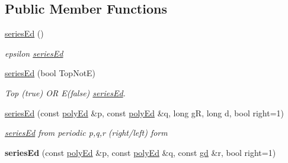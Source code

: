 \subsection*{Public Member Functions}
\begin{DoxyCompactItemize}
\item 
\mbox{\label{classetvo_i_i_1_1series_ed_a86e516a6ad92778dc3fd9b6d8b09a726}} 
\mbox{\hyperlink{classetvo_i_i_1_1series_ed_a86e516a6ad92778dc3fd9b6d8b09a726}{series\+Ed}} ()
\begin{DoxyCompactList}\small\item\em epsilon \mbox{\hyperlink{classetvo_i_i_1_1series_ed}{series\+Ed}} \end{DoxyCompactList}\item 
\mbox{\label{classetvo_i_i_1_1series_ed_a6d05a75db474ff6ba6a2f790a4a93ff0}} 
\mbox{\hyperlink{classetvo_i_i_1_1series_ed_a6d05a75db474ff6ba6a2f790a4a93ff0}{series\+Ed}} (bool Top\+NotE)
\begin{DoxyCompactList}\small\item\em Top (true) OR E(false) \mbox{\hyperlink{classetvo_i_i_1_1series_ed}{series\+Ed}}. \end{DoxyCompactList}\item 
\mbox{\label{classetvo_i_i_1_1series_ed_a0945f34c4e3a7ed30a95e36e64b3f2b7}} 
\mbox{\hyperlink{classetvo_i_i_1_1series_ed_a0945f34c4e3a7ed30a95e36e64b3f2b7}{series\+Ed}} (const \mbox{\hyperlink{classetvo_i_i_1_1poly_ed}{poly\+Ed}} \&p, const \mbox{\hyperlink{classetvo_i_i_1_1poly_ed}{poly\+Ed}} \&q, long gR, long d, bool right=1)
\begin{DoxyCompactList}\small\item\em \mbox{\hyperlink{classetvo_i_i_1_1series_ed}{series\+Ed}} from periodic p,q,r (right/left) form \end{DoxyCompactList}\item 
\mbox{\label{classetvo_i_i_1_1series_ed_a2e527305328d8fc00f61a9d9f11f4105}} 
{\bfseries series\+Ed} (const \mbox{\hyperlink{classetvo_i_i_1_1poly_ed}{poly\+Ed}} \&p, const \mbox{\hyperlink{classetvo_i_i_1_1poly_ed}{poly\+Ed}} \&q, const \mbox{\hyperlink{classetvo_i_i_1_1gd}{gd}} \&r, bool right=1)
\item 
\mbox{\label{classetvo_i_i_1_1series_ed_a8a41844c37669d9e08288aeb533ba55a}} 

\end{DoxyCompactItemize}
